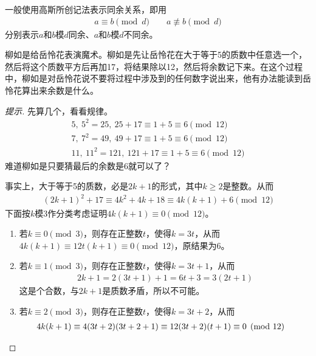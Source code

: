 一般使用高斯所创记法表示同余关系，即用
\begin{align*}
  a \equiv b \pmod d \quad\quad a\not\equiv b\pmod d
\end{align*}
分别表示$a$和$b$模$d$同余、$a$和$b$模$d$不同余。

\begin{example}[余6的魔术]
  柳如是给岳怜花表演魔术。柳如是先让岳怜花在大于等于5的质数中任意选一个，然后将这个质数平方后再加17，将结果除以12，然后将余数记下来。在这个过程中，柳如是对岳怜花说不要将过程中涉及到的任何数字说出来，他有办法能读到岳怜花算出来余数是什么。
\end{example}
\begin{proof}[提示]
  先算几个，看看规律。
  \begin{align*}
    5,\ 5^2 = 25,\ 25 + 17\equiv 1+5\equiv 6 \pmod{12}\\
    7,\ 7^2 = 49,\ 49 + 17\equiv 1+5\equiv 6 \pmod{12}\\
    11,\ 11^2=121,\ 121 + 17\equiv 1+5\equiv 6\pmod{12}
  \end{align*}
  难道柳如是只要猜最后的余数是6就可以了？

  事实上，大于等于5的质数，必是$2k+1$的形式，其中$k\ge 2$是整数。从而
  \begin{align*}
    (2k+1)^2 + 17\equiv 4k^2 + 4k + 18\equiv 4k(k+1) + 6\pmod{12}
  \end{align*}
  下面按$k$模3作分类考虑证明$4k(k+1)\equiv0\pmod{12}$。
  \begin{enumerate}
  \item 若$k\equiv 0\pmod{3}$，则存在正整数$t$，使得$k=3t$，从而$4k(k+1)\equiv12t(k+1)\equiv 0\pmod{12}$，原结果为6。
  \item 若$k\equiv 1\pmod{3}$，则存在正整数$t$，使得$k=3t+1$，从而
    \begin{align*}
      2k + 1 = 2(3t + 1) + 1 = 6t + 3 = 3(2t+1)
    \end{align*}
    这是个合数，与$2k+1$是质数矛盾，所以不可能。
  \item 若$k\equiv 2\pmod{3}$，则存在正整数$t$，使得$k=3t+2$，从而
    \begin{align*}
      4k(k+1) \equiv 4(3t+2)(3t+2+1) \equiv 12(3t+2)(t+1)\equiv0\pmod{12}&\qedhere
    \end{align*}
  \end{enumerate}
\end{proof}

